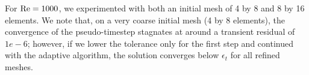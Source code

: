 \documentclass{article}
\newcommand{\Reyn}{\rm Re}
\begin{document}
For $\Reyn = 1000$, we experimented with both an initial mesh of 4 by 8 and 8 by 16 elements. We note that, on a very coarse initial mesh (4 by 8 elements), the convergence of the pseudo-timestep stagnates at around a transient residual of $1e-6$; however, if we lower the tolerance only for the first step and continued with the adaptive algorithm, the solution converges below $\epsilon_t$ for all refined meshes. 
\begin{figure}[!h]
\centering
{}

\end{figure}
\end{document}
